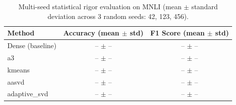 \begin{table}[t]
\centering
\caption{Multi-seed statistical rigor evaluation on MNLI (mean $\pm$ standard deviation across 3 random seeds: 42, 123, 456).}
\label{tab:multiseed}
\begin{tabular}{lcc}
\toprule
\textbf{Method} & \textbf{Accuracy (mean $\pm$ std)} & \textbf{F1 Score (mean $\pm$ std)} \\
\midrule
Dense (baseline)     & -- $\pm$ -- & -- $\pm$ -- \\
a3                   & -- $\pm$ -- & -- $\pm$ -- \\
kmeans               & -- $\pm$ -- & -- $\pm$ -- \\
aasvd                & -- $\pm$ -- & -- $\pm$ -- \\
adaptive\_svd        & -- $\pm$ -- & -- $\pm$ -- \\
\bottomrule
\end{tabular}
\end{table}
